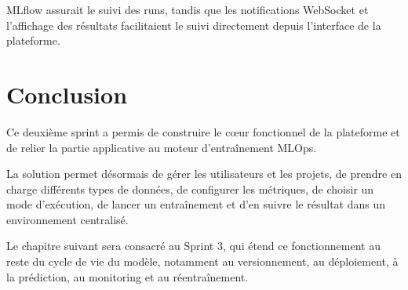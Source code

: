 MLflow assurait le suivi des runs, tandis que les notifications WebSocket
et l'affichage des résultats facilitaient le suivi directement depuis
l'interface de la plateforme.



\section{Conclusion}
\label{sec:ch4-conclusion}

Ce deuxième sprint a permis de construire le cœur fonctionnel de la
plateforme et de relier la partie applicative au moteur d'entraînement
MLOps.

La solution permet désormais de gérer les utilisateurs et les projets,
de prendre en charge différents types de données, de configurer les
métriques, de choisir un mode d'exécution, de lancer un entraînement et
d'en suivre le résultat dans un environnement centralisé.

Le chapitre suivant sera consacré au Sprint 3, qui étend ce
fonctionnement au reste du cycle de vie du modèle, notamment au
versionnement, au déploiement, à la prédiction, au monitoring et au
réentraînement.

